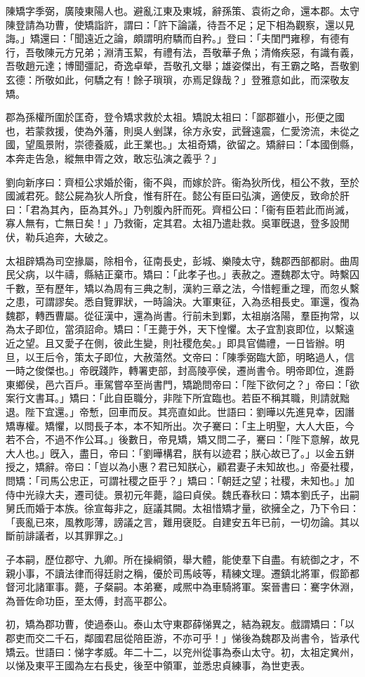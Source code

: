 
\begin{pinyinscope}
陳矯字季弼，廣陵東陽人也。避亂江東及東城，辭孫策、袁術之命，還本郡。太守陳登請為功曹，使矯詣許，謂曰：「許下論議，待吾不足；足下相為觀察，還以見誨。」矯還曰：「聞遠近之論，頗謂明府驕而自矜。」登曰：「夫閨門雍穆，有德有行，吾敬陳元方兄弟；淵清玉絜，有禮有法，吾敬華子魚；清脩疾惡，有識有義，吾敬趙元達；博聞彊記，奇逸卓犖，吾敬孔文舉；雄姿傑出，有王霸之略，吾敬劉玄德：所敬如此，何驕之有！餘子瑣瑣，亦焉足錄哉？」登雅意如此，而深敬友矯。

郡為孫權所圍於匡奇，登令矯求救於太祖。矯說太祖曰：「鄙郡雖小，形便之國也，若蒙救援，使為外藩，則吳人剉謀，徐方永安，武聲遠震，仁愛滂流，未從之國，望風景附，崇德養威，此王業也。」太祖奇矯，欲留之。矯辭曰：「本國倒縣，本奔走告急，縱無申胥之效，敢忘弘演之義乎？」

劉向新序曰：齊桓公求婚於衞，衞不與，而嫁於許。衞為狄所伐，桓公不救，至於國滅君死。懿公屍為狄人所食，惟有肝在。懿公有臣曰弘演，適使反，致命於肝曰：「君為其內，臣為其外。」乃刳腹內肝而死。齊桓公曰：「衞有臣若此而尚滅，寡人無有，亡無日矣！」乃救衞，定其君。太祖乃遣赴救。吳軍旣退，登多設閒伏，勒兵追奔，大破之。

太祖辟矯為司空掾屬，除相令，征南長史，彭城、樂陵太守，魏郡西部都尉。曲周民父病，以牛禱，縣結正棄市。矯曰：「此孝子也。」表赦之。遷魏郡太守。時繫囚千數，至有歷年，矯以為周有三典之制，漢約三章之法，今惜輕重之理，而忽乆繫之患，可謂謬矣。悉自覽罪狀，一時論決。大軍東征，入為丞相長史。軍還，復為魏郡，轉西曹屬。從征漢中，還為尚書。行前未到鄴，太祖崩洛陽，羣臣拘常，以為太子即位，當須詔命。矯曰：「王薨于外，天下惶懼。太子宜割哀即位，以繫遠近之望。且又愛子在側，彼此生變，則社稷危矣。」即具官備禮，一日皆辦。明旦，以王后令，策太子即位，大赦蕩然。文帝曰：「陳季弼臨大節，明略過人，信一時之俊傑也。」帝旣踐阼，轉署吏部，封高陵亭侯，遷尚書令。明帝即位，進爵東鄉侯，邑六百戶。車駕嘗卒至尚書門，矯跪問帝曰：「陛下欲何之？」帝曰：「欲案行文書耳。」矯曰：「此自臣職分，非陛下所宜臨也。若臣不稱其職，則請就黜退。陛下宜還。」帝慙，回車而反。其亮直如此。世語曰：劉曄以先進見幸，因譖矯專權。矯懼，以問長子本，本不知所出。次子騫曰：「主上明聖，大人大臣，今若不合，不過不作公耳。」後數日，帝見矯，矯又問二子，騫曰：「陛下意解，故見大人也。」旣入，盡日，帝曰：「劉曄構君，朕有以迹君；朕心故已了。」以金五鉼授之，矯辭。帝曰：「豈以為小惠？君已知朕心，顧君妻子未知故也。」帝憂社稷，問矯：「司馬公忠正，可謂社稷之臣乎？」矯曰：「朝廷之望；社稷，未知也。」加侍中光祿大夫，遷司徒。景初元年薨，謚曰貞侯。魏氏春秋曰：矯本劉氏子，出嗣舅氏而婚于本族。徐宣每非之，庭議其闕。太祖惜矯才量，欲擁全之，乃下令曰：「喪亂已來，風教彫薄，謗議之言，難用襃貶。自建安五年已前，一切勿論。其以斷前誹議者，以其罪罪之。」

子本嗣，歷位郡守、九卿。所在操綱領，舉大體，能使羣下自盡。有統御之才，不親小事，不讀法律而得廷尉之稱，優於司馬岐等，精練文理。遷鎮北將軍，假節都督河北諸軍事。薨，子粲嗣。本弟騫，咸熈中為車騎將軍。案晉書曰：騫字休淵，為晉佐命功臣，至太傅，封高平郡公。

初，矯為郡功曹，使過泰山。泰山太守東郡薛悌異之，結為親友。戲謂矯曰：「以郡吏而交二千石，鄰國君屈從陪臣游，不亦可乎！」悌後為魏郡及尚書令，皆承代矯云。世語曰：悌字孝威。年二十二，以兖州從事為泰山太守。初，太祖定兾州，以悌及東平王國為左右長史，後至中領軍，並悉忠貞練事，為世吏表。


\end{pinyinscope}